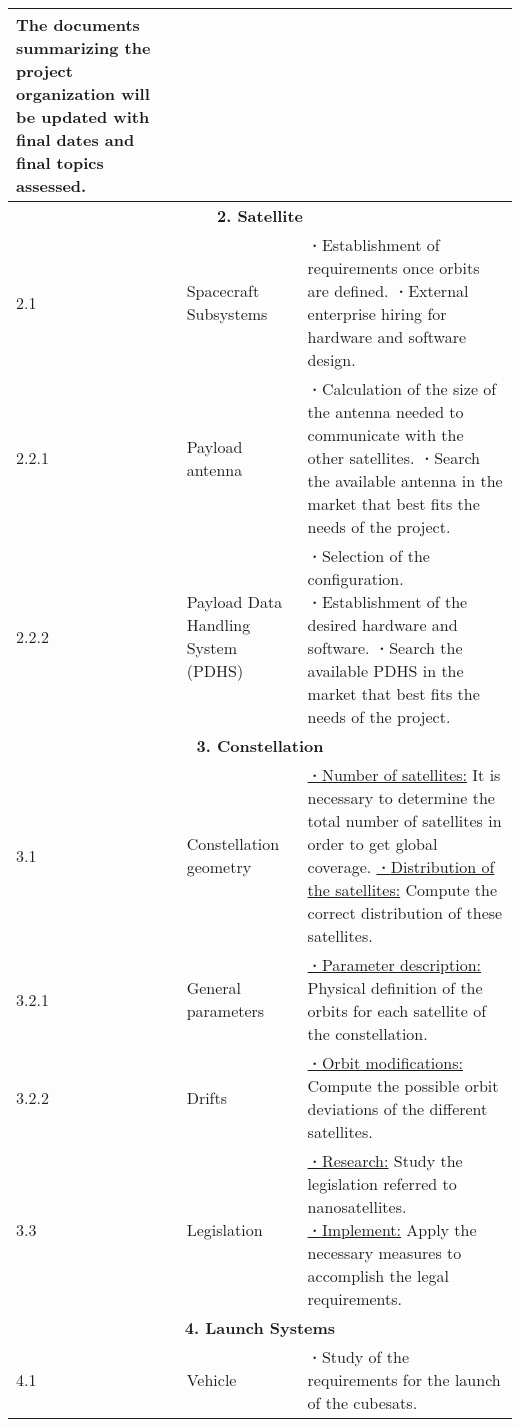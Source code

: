\begin{longtable}{ | p{1.3cm} | p{3cm} | p{11cm} |}
The documents summarizing the project organization will be updated with final dates and final topics assessed.
\\
\hline
\multicolumn{3}{|c|}{\textbf{2. Satellite}} \\ \hline
2.1 & Spacecraft Subsystems &  \textbf{·}Establishment of requirements once orbits are defined. \newline
\textbf{·}External enterprise hiring for hardware and software design.
\\ \hline
2.2.1 & Payload antenna &  \textbf{·}Calculation of the size of the antenna needed to communicate with the other satellites. \newline
\textbf{·}Search the available antenna in the market that best fits the needs of the project.
\\
\hline
2.2.2 & Payload Data Handling System (PDHS) &  \textbf{·}Selection of the configuration. \newline
\textbf{·}Establishment of the desired hardware and software.
\newline
\textbf{·}Search the available PDHS in the market that best fits the needs of the project.
\\
\hline
\multicolumn{3}{|c|}{\textbf{3. Constellation}} \\ \hline
3.1 & Constellation geometry & \underline{\textbf{·}Number of satellites:} It is necessary to determine the total number of satellites in order to get global coverage. \newline
\underline{\textbf{·}Distribution of the satellites:} Compute the correct distribution of these satellites. \\
\hline
3.2.1 & General parameters & \underline{\textbf{·}Parameter description:} Physical definition of the orbits for each satellite of the constellation. \\ \hline
3.2.2 & Drifts & \underline{\textbf{·}Orbit modifications:} Compute the possible orbit deviations of the different satellites. \\ \hline
3.3 & Legislation & \underline{\textbf{·}Research:} Study the legislation referred to nanosatellites. \newline
\underline{\textbf{·}Implement:} Apply the necessary measures to accomplish the legal requirements. \\ \hline
\multicolumn{3}{|c|}{\textbf{4. Launch Systems}} \\ \hline
4.1 & Vehicle  & \textbf{·}Study of the requirements for the launch of the cubesats. \newline

\end{longtable}
